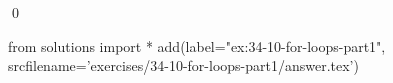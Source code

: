 
\begin{ex}
  \label{ex:34-10-for-loops-part1}
  
  \qed
\end{ex}
\begin{python0}
from solutions import *
add(label="ex:34-10-for-loops-part1",
    srcfilename='exercises/34-10-for-loops-part1/answer.tex')
\end{python0}
